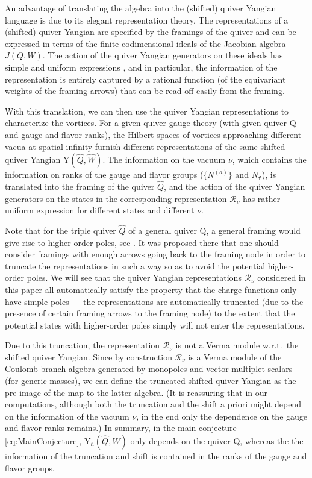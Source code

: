 \documentclass[12pt,a4paper]{article}
\renewcommand{\(}{\left(}
\renewcommand{\)}{\right)}
\renewcommand{\(}{\left(}
\renewcommand{\)}{\right)}
\begin{document}
An advantage of translating the algebra into the (shifted) quiver Yangian language is due to its elegant representation theory. 
The representations of a (shifted) quiver Yangian are specified by the framings of the quiver and can be expressed in terms of the finite-codimensional ideals of the Jacobian algebra $J(Q,W)$. 
The action of the quiver Yangian generators on these ideals has simple and uniform expressions \cite{Li:2020rij,Li:2023zub}, and in particular, the information of the representation is entirely captured by a rational function (of the equivariant weights of the framing arrows) that can be read off easily from the framing.


With this translation, we can then use the quiver Yangian representations to characterize the vortices. 
For a given quiver gauge theory (with given quiver $\mathrm{Q}$ and gauge and flavor ranks), the Hilbert spaces of vortices approaching different vacua at spatial infinity furnish different  representations of the same shifted quiver Yangian Y$(\widehat{Q},\widehat{W})$.
The information on the vacuum $\nu$, which contains the information on ranks of the gauge and flavor groups ($\{N^{(a)}\}$ and $N_{\mathtt{f}}$), is translated into the framing of the quiver $\widehat{Q}$, and the action of the quiver Yangian generators on the states in the corresponding representation $\mathcal{R}_{\nu}$ has rather uniform expression for different states and  different $\nu$.

\medskip

Note that for the triple quiver $\widehat{Q}$ of a general  quiver $\mathrm{Q}$, a general framing would give rise to higher-order poles, see \cite[App.~C]{Li:2023zub}.
It was proposed there that one should consider framings with enough arrows going back to the framing node in order to truncate the representations in such a way so as to avoid the potential higher-order poles. 
We will see that the quiver Yangian representations $\mathcal{R}_{\nu}$ considered in this paper all automatically satisfy the property that the charge functions only have simple poles --- the representations are automatically truncated (due to the presence of certain framing arrows to the framing node) to the extent that the potential states with higher-order poles simply will not enter the representations.

\medskip

Due to this truncation, the representation $\mathcal{R}_{\nu}$ is not a Verma module w.r.t.\ the shifted quiver Yangian.
Since by construction $\mathcal{R}_{\nu}$ is a Verma module of the Coulomb branch algebra generated by monopoles and vector-multiplet scalars (for generic masses), we can define the truncated shifted quiver Yangian as the pre-image of the map to the latter algebra.
(It is reassuring that in our computations, although both the truncation and the shift a priori might depend on the information of the vacuum $\nu$, in the end only the dependence on the gauge and flavor ranks remains.) 
In summary, in the main conjecture \eqref{eq:MainConjecture},  Y$_{\hbar}(\widehat{Q},\widehat{W})$ only depends on the quiver $\mathrm{Q}$, whereas the 
the information of the truncation and shift is contained in the ranks of the gauge and flavor groups.
\end{document}
